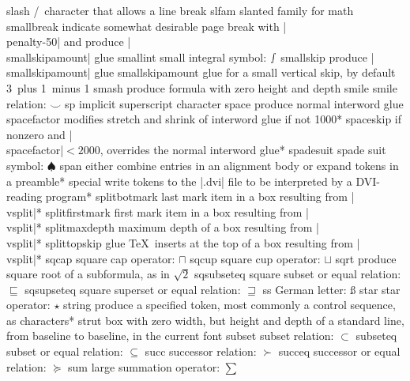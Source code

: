 \capcs slash {\slash\ character that allows a line break}{}{}
\capcs slfam {slanted family for math}{}{}
\capcs smallbreak {indicate somewhat desirable page break
   with |\\penalty-50| and produce |\\smallskipamount| glue}{}{}
\capcs smallint {small integral symbol: $\smallint$}{}{}
\capcs smallskip {produce |\\smallskipamount| glue}{}{}
\capcs smallskipamount {glue for a small vertical skip, by default 3\pt\
   plus 1\pt\ minus 1\pt}{}{}
\capcs smash {produce formula with zero height and depth}{}{}
\capcs smile {smile relation: $\smile$}{}{}
\capcs sp {implicit superscript character}{}{}
\capcs space {produce normal interword glue}{}{}
\capcs spacefactor {modifies stretch and shrink of interword glue 
   if not 1000}*{}
\capcs spaceskip {if nonzero and |\\spacefactor|${}<2000$, overrides
    the normal interword glue}*{}
\capcs spadesuit {spade suit symbol: $\spadesuit$}{}{}
\capcs span {either combine entries in an alignment body or expand tokens in a
   preamble}*{}
\capcs special {write tokens to the |.dvi| file to be interpreted by a
   DVI-reading program}*{}
\capcs splitbotmark {last mark item in a box resulting from |\\vsplit|}*{}
\capcs splitfirstmark {first mark item in a box resulting from
   |\\vsplit|}*{}
\capcs splitmaxdepth {maximum depth of a box resulting from |\\vsplit|}*{}
\capcs splittopskip {glue \TeX\ inserts at the top of a box resulting from 
   |\\vsplit|}*{}
\capcs sqcap {square cap operator: $\sqcap$}{}{}
\capcs sqcup {square cup operator: $\sqcup$}{}{}
\capcs sqrt {produce square root of a subformula, as in $\sqrt 2$}{}{}
\capcs sqsubseteq {square subset or equal relation: $\sqsubseteq$}{}{}
\capcs sqsupseteq {square superset or equal relation: $\sqsupseteq$}{}{}
\capcs ss {German letter: \ss}{}{}
\capcs star {star operator: $\star$}{}{}
\capcs string {produce a specified token, most commonly a control
   sequence, as characters}*{}
\capcs strut {box with zero width, but height and depth of a standard
   line, from baseline to baseline, in the current font}{}{}
\capcs subset {subset relation: $\subset$}{}{}
\capcs subseteq {subset or equal relation: $\subseteq$}{}{}
\capcs succ {successor relation: $\succ$}{}{}
\capcs succeq {successor or equal relation: $\succeq$}{}{}
\capcs sum {large summation operator: $\sum$}{}{}
